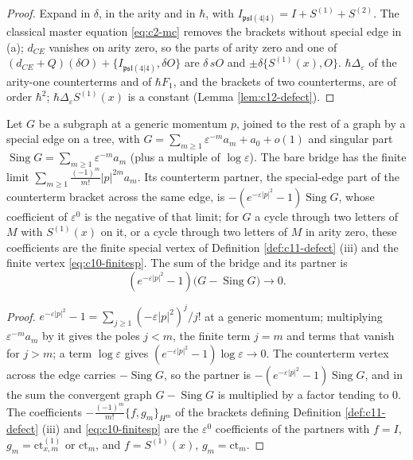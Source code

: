 \begin{proof}
Expand in $\delta$, in the arity and in $\hbar$, with $I_{\mathfrak{psl}(4|4)}=I+S^{(1)}+S^{(2)}$. The classical master equation \eqref{eq:c2-mc} removes the brackets without special edge in (a); $d_{CE}$ vanishes on arity zero, so the parts of arity zero and one of $(d_{CE}+Q)(\delta O)+\{I_{\mathfrak{psl}(4|4)},\delta O\}$ are $\delta\,sO$ and $\pm\delta\{S^{(1)}(x),O\}$. $\hbar\Delta_\varepsilon$ of the arity-one counterterms and of $\hbar F_1$, and the brackets of two counterterms, are of order $\hbar^2$; $\hbar\Delta_\varepsilon S^{(1)}(x)$ is a constant (Lemma \ref{lem:c12-defect}).
\end{proof}

\begin{lemma}
\label{lem:c12-bridge}
Let $G$ be a subgraph at a generic momentum $p$, joined to the rest of a graph by a special edge on a tree, with $G=\sum_{m\ge1}\varepsilon^{-m}a_m+a_0+o(1)$ and singular part $\operatorname{Sing}G=\sum_{m\ge1}\varepsilon^{-m}a_m$ (plus a multiple of $\log\varepsilon$). The bare bridge has the finite limit $\sum_{m\ge1}\frac{(-1)^m}{m!}|p|^{2m}a_m$. Its counterterm partner, the special-edge part of the counterterm bracket across the same edge, is $-(e^{-\varepsilon|p|^2}-1)\operatorname{Sing}G$, whose coefficient of $\varepsilon^0$ is the negative of that limit; for $G$ a cycle through two letters of $M$ with $S^{(1)}(x)$ on it, or a cycle through two letters of $M$ in arity zero, these coefficients are the finite special vertex of Definition \ref{def:c11-defect} (iii) and the finite vertex \eqref{eq:c10-finitesp}. The sum of the bridge and its partner is
\begin{equation}
(e^{-\varepsilon|p|^2}-1)\big(G-\operatorname{Sing}G\big)\longrightarrow0 .
\label{eq:c12-bridge}
\end{equation}
\end{lemma}

\begin{proof}
$e^{-\varepsilon|p|^2}-1=\sum_{j\ge1}(-\varepsilon|p|^2)^j/j!$ at a generic momentum; multiplying $\varepsilon^{-m}a_m$ by it gives the poles $j<m$, the finite term $j=m$ and terms that vanish for $j>m$; a term $\log\varepsilon$ gives $(e^{-\varepsilon|p|^2}-1)\log\varepsilon\to0$. The counterterm vertex across the edge carries $-\operatorname{Sing}G$, so the partner is $-(e^{-\varepsilon|p|^2}-1)\operatorname{Sing}G$, and in the sum the convergent graph $G-\operatorname{Sing}G$ is multiplied by a factor tending to $0$. The coefficients $-\frac{(-1)^m}{m!}\{f,g_m\}_{H^m}$ of the brackets defining Definition \ref{def:c11-defect} (iii) and \eqref{eq:c10-finitesp} are the $\varepsilon^0$ coefficients of the partners with $f=I$, $g_m=\mathrm{ct}^{(1)}_{x,m}$ or $\mathrm{ct}_m$, and $f=S^{(1)}(x)$, $g_m=\mathrm{ct}_m$.
\end{proof}

